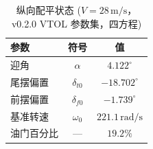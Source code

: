 \begin{table}[H]
\centering
\caption{纵向配平状态 ($V=28\,\text{m/s}$，v0.2.0 VTOL 参数集，四方程)}
\label{tab:trim}
\small
\begin{tabular}{l c c}
\toprule
\textbf{参数} & \textbf{符号} & \textbf{值} \\
\midrule
迎角 & $\alpha$ & $4.122^\circ$ \\
尾摆偏置 & $\delta_{t0}$ & $-18.702^\circ$ \\
前摆偏置 & $\delta_{f0}$ & $-1.739^\circ$ \\
基准转速 & $\omega_0$ & $221.1\,\text{rad/s}$ \\
油门百分比 & — & $19.2\%$ \\
\bottomrule
\end{tabular}
\end{table}
